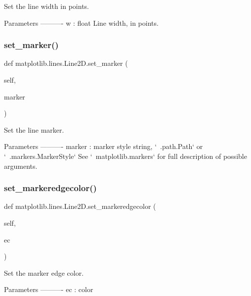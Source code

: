 \begin{DoxyVerb}Set the line width in points.

Parameters
----------
w : float
    Line width, in points.
\end{DoxyVerb}
 \mbox{\label{classmatplotlib_1_1lines_1_1Line2D_a42df9f05232a27c6c066a80ff10e5a54}} 
\subsubsection{\texorpdfstring{set\+\_\+marker()}{set\_marker()}}
{\footnotesize\ttfamily def matplotlib.\+lines.\+Line2\+D.\+set\+\_\+marker (\begin{DoxyParamCaption}\item[{}]{self,  }\item[{}]{marker }\end{DoxyParamCaption})}

\begin{DoxyVerb}Set the line marker.

Parameters
----------
marker : marker style string, `~.path.Path` or `~.markers.MarkerStyle`
    See `~matplotlib.markers` for full description of possible
    arguments.
\end{DoxyVerb}
 \mbox{\label{classmatplotlib_1_1lines_1_1Line2D_ae82deaad7ca54c875d74ec46da8fd50e}} 
\subsubsection{\texorpdfstring{set\+\_\+markeredgecolor()}{set\_markeredgecolor()}}
{\footnotesize\ttfamily def matplotlib.\+lines.\+Line2\+D.\+set\+\_\+markeredgecolor (\begin{DoxyParamCaption}\item[{}]{self,  }\item[{}]{ec }\end{DoxyParamCaption})}

\begin{DoxyVerb}Set the marker edge color.

Parameters
----------
ec : color
\end{DoxyVerb}
 \mbox{\label{classmatplotlib_1_1lines_1_1Line2D_a850f2858aaf262795c68957e69d8dbc7}} 
